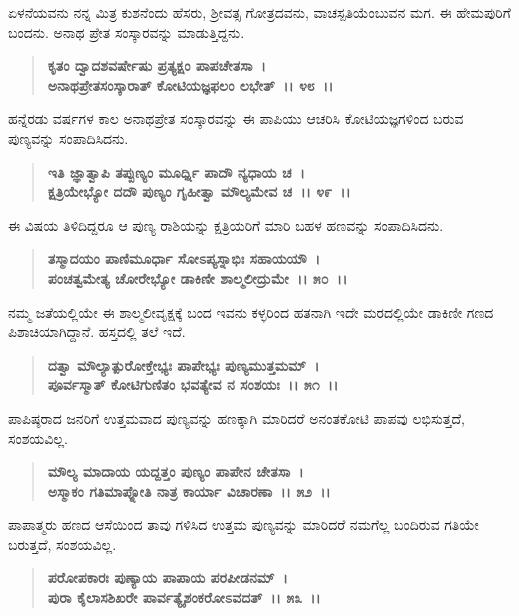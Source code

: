 ಏಳನೆಯವನು ನನ್ನ ಮಿತ್ರ ಕುಶನೆಂದು ಹೆಸರು, ಶ‍್ರೀವತ್ಸ ಗೋತ್ರದವನು, ವಾಚಸ್ಪತಿಯೆಂಬುವನ ಮಗ. ಈ ಹೇಮಪುರಿಗೆ ಬಂದನು. ಅನಾಥ ಪ್ರೇತ ಸಂಸ್ಕಾರವನ್ನು ಮಾಡುತ್ತಿದ್ದನು.

\begin{verse}
\textbf{ಕೃತಂ ದ್ವಾದಶವರ್ಷೇಷು ಪ್ರತ್ಯಕ್ಷಂ ಪಾಪಚೇತಸಾ~।}\\\textbf{ಅನಾಥಪ್ರೇತಸಂಸ್ಕಾರಾತ್ ಕೋಟಿಯಜ್ಞಫಲಂ ಲಭೇತ್~।। ೪೮~।।}
\end{verse}

ಹನ್ನೆರಡು ವರ್ಷಗಳ ಕಾಲ ಅನಾಥಪ್ರೇತ ಸಂಸ್ಕಾರವನ್ನು ಈ ಪಾಪಿಯು ಆಚರಿಸಿ ಕೋಟಿಯಜ್ಞಗಳಿಂದ ಬರುವ ಪುಣ್ಯವನ್ನು ಸಂಪಾದಿಸಿದನು.

\begin{verse}
\textbf{ಇತಿ ಜ್ಞಾತ್ವಾಪಿ ತಪ್ಪುಣ್ಯಂ ಮೂರ್ಧ್ನಿ ಪಾದೌ ನ್ಯಧಾಯ ಚ~।}\\\textbf{ಕ್ಷತ್ರಿಯೇಭ್ಯೋ ದದೌ ಪುಣ್ಯಂ ಗೃಹೀತ್ವಾ ಮೌಲ್ಯಮೇವ ಚ~।। ೪೯~।। }
\end{verse}

ಈ ವಿಷಯ ತಿಳಿದಿದ್ದರೂ ಆ ಪುಣ್ಯ ರಾಶಿಯನ್ನು ಕ್ಷತ್ರಿಯರಿಗೆ ಮಾರಿ ಬಹಳ ಹಣವನ್ನು ಸಂಪಾದಿಸಿದನು.

\begin{verse}
\textbf{ತಸ್ಮಾದಯಂ ಪಾಣಿಮೂರ್ಧಾ ಸೋಽಪ್ಯಸ್ನಾಭಿಃ ಸಹಾಯಯೌ~।}\\\textbf{ಪಂಚತ್ವಮೇತ್ಯ ಚೋರೇಭ್ಯೋ ಡಾಕಿಣೀ ಶಾಲ್ಮಲೀದ್ರುಮೇ~।। ೫೦~।। }
\end{verse}

ನಮ್ಮ ಜತೆಯಲ್ಲಿಯೇ ಈ ಶಾಲ್ಮಲೀವೃಕ್ಷಕ್ಕೆ ಬಂದ ಇವನು ಕಳ್ಳರಿಂದ ಹತನಾಗಿ ಇದೇ ಮರದಲ್ಲಿಯೇ ಡಾಕಿಣೀ ಗಣದ ಪಿಶಾಚಿಯಾಗಿದ್ದಾನೆ. ಹಸ್ತದಲ್ಲಿ ತಲೆ ಇದೆ.

\begin{verse}
\textbf{ದತ್ವಾ ಮೌಲ್ಯಾತ್ಪುರೋಕ್ತೇಭ್ಯಃ ಪಾಪೇಭ್ಯಃ ಪುಣ್ಯಮುತ್ತಮಮ್~।}\\\textbf{ಪೂರ್ವಸ್ಮಾತ್ ಕೋಟಿಗುಣಿತಂ ಭವತ್ಯೇವ ನ ಸಂಶಯಃ~।। ೫೧~।।}
\end{verse}

ಪಾಪಿಷ್ಠರಾದ ಜನರಿಗೆ ಉತ್ತಮವಾದ ಪುಣ್ಯವನ್ನು ಹಣಕ್ಕಾಗಿ ಮಾರಿದರೆ ಅನಂತಕೋಟಿ ಪಾಪವು ಲಭಿಸುತ್ತದೆ, ಸಂಶಯವಿಲ್ಲ.

\begin{verse}
\textbf{ಮೌಲ್ಯ ಮಾದಾಯ ಯದ್ದತ್ತಂ ಪುಣ್ಯಂ ಪಾಪೇನ ಚೇತಸಾ~।}\\\textbf{ಅಸ್ಮಾಕಂ ಗತಿಮಾಪ್ನೋತಿ ನಾತ್ರ ಕಾರ್ಯಾ ವಿಚಾರಣಾ~।। ೫೨~।। }
\end{verse}

ಪಾಪಾತ್ಮರು ಹಣದ ಆಸೆಯಿಂದ ತಾವು ಗಳಿಸಿದ ಉತ್ತಮ ಪುಣ್ಯವನ್ನು ಮಾರಿದರೆ ನಮಗೆಲ್ಲ ಬಂದಿರುವ ಗತಿಯೇ ಬರುತ್ತದೆ, ಸಂಶಯವಿಲ್ಲ.

\begin{verse}
\textbf{ಪರೋಪಕಾರಃ ಪುಣ್ಯಾಯ ಪಾಪಾಯ ಪರಪೀಡನಮ್~।}\\\textbf{ಪುರಾ ಕೈಲಾಸಶಿಖರೇ ಪಾರ್ವತ್ಯೈಶಂಕರೋಽವದತ್~।। ೫೩~।। }
\end{verse}

